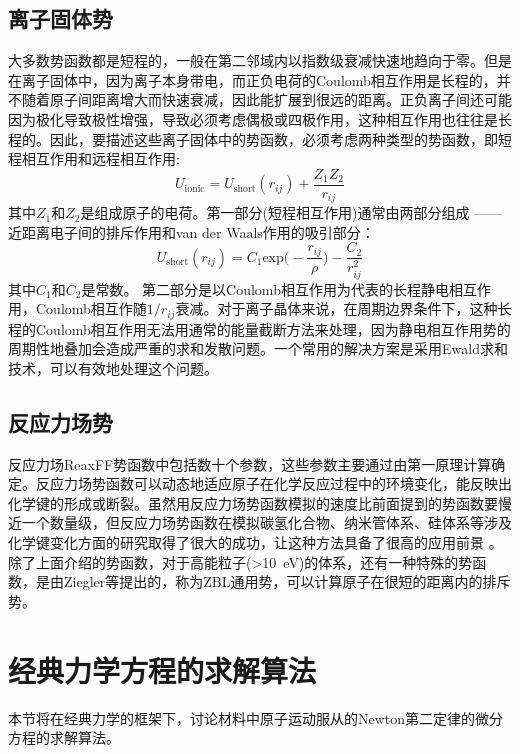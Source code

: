 \subsection{离子固体势}
大多数势函数都是短程的，一般在第二邻域内以指数级衰减快速地趋向于零。但是在离子固体中，因为离子本身带电，而正负电荷的\textrm{Coulomb}相互作用是长程的，并不随着原子间距离增大而快速衰减，因此能扩展到很远的距离。正负离子间还可能因为极化导致极性增强，导致必须考虑偶极或四极作用，这种相互作用也往往是长程的。因此，要描述这些离子固体中的势函数，必须考虑两种类型的势函数，即短程相互作用和远程相互作用:
\begin{equation}
	U_{\mathrm{ionic}}=U_{\mathrm{short}}(r_{ij})+\dfrac{Z_1Z_2}{r_{ij}}
	\label{eq:Potential_ionic}
\end{equation}
其中$Z_1$和$Z_2$是组成原子的电荷。第一部分(短程相互作用)通常由两部分组成 ——近距离电子间的排斥作用和\textrm{van der Waals}作用的吸引部分：
\begin{equation}
	U_{\mathrm{short}}(r_{ij})=C_1\mathrm{exp}\bigg(-\dfrac{r_{ij}}{\rho}\bigg)-\dfrac{C_2}{r_{ij}^2}
	\label{eq:Potential_ionic_vdW}
\end{equation}
其中$C_1$和$C_2$是常数。
第二部分是以\textrm{Coulomb}相互作用为代表的长程静电相互作用，\textrm{Coulomb}相互作随$1/r_{ij}$衰减。对于离子晶体来说，在周期边界条件下，这种长程的\textrm{Coulomb}相互作用无法用通常的能量截断方法来处理，因为静电相互作用势的周期性地叠加会造成严重的求和发散问题。一个常用的解决方案是采用\textrm{Ewald}求和技术\cite{AP369-253_1921}，可以有效地处理这个问题。%
\subsection{反应力场势}
反应力场\textrm{ReaxFF}势函数\cite{JPCA105-9396_2001}中包括数十个参数，这些参数主要通过由第一原理计算确定。反应力场势函数可以动态地适应原子在化学反应过程中的环境变化，能反映出化学键的形成或断裂。虽然用反应力场势函数模拟的速度比前面提到的势函数要慢近一个数量级，但反应力场势函数在模拟碳氢化合物、纳米管体系、硅体系等涉及化学键变化方面的研究取得了很大的成功，让这种方法具备了很高的应用前景
。
除了上面介绍的势函数，对于高能粒子(>10~\textrm{eV})的体系，还有一种特殊的势函数，是由\textrm{Ziegler}等提出的，称为\textrm{ZBL}通用势\cite{ZBL-1985}，可以计算原子在很短的距离内的排斥势。

\section{经典力学方程的求解算法}\label{section:MD_algorithm}
本节将在经典力学的框架下，讨论材料中原子运动服从的\textrm{Newton}第二定律的微分方程的求解算法。
